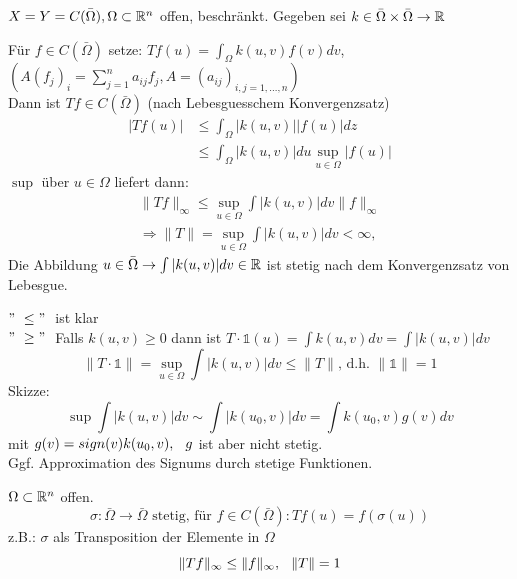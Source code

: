 \begin{beispiel}[Integraloperator]
	$X = Y = C(\bar \Omega), \Omega \subset \mathbb{R}^{n}$ offen, beschränkt.
	Gegeben sei $k \in \bar \Omega \times \bar \Omega \rightarrow \mathbb{R} $
	
	Für $f \in C(\bar \Omega)$ setze: $Tf(u) = \int_{\Omega} k(u, v) f(v) dv$, \hspace{0.25cm}
	$( A( f_{j} )_{i} = \sum_{j = 1}^{n} a_{ij}f_{j}, A = (a_{ij})_{i,j = 1, \dotsc, n} )$ \\
	
	Dann ist $Tf \in C(\bar \Omega)$ (nach Lebesguesschem Konvergenzsatz)
	\begin{align*}
		|T f(u)| & \leq \int_{\Omega} |k(u, v)| |f(u)| dz \\
				 & \leq \int_{\Omega} |k(u, v)| du \sup_{u \in \Omega} | f(u) |
	\end{align*} 				 
	$\sup$ über $u \in \Omega$ liefert dann:
	\begin{align*}
		\| Tf \|_{\infty} \leq \sup_{u \in \Omega} \int |k(u,v)| dv \| f \|_{\infty} \\
		\Rightarrow \| T \| = \sup_{u \in \Omega} \int |k(u, v)| dv < \infty,
	\end{align*} 	
	Die Abbildung $u \in \bar \Omega \rightarrow \int |k(u, v)| dv \in \mathbb{R}$ ist stetig nach dem Konvergenzsatz von Lebesgue. \\
	\begin{beweis}
		$ "\ \leq "\ $ ist klar \\
		$ "\ \geq "\ $ Falls $ k(u, v) \geq 0$ dann ist $T \cdot \mathds{1} (u) = \int k(u, v) dv = \int |k(u, v)| dv$ \\
		\[ \| T \cdot \mathds{1} \| = \sup_{u \in \Omega} \int |k(u, v)| dv \leq \| T \| \text{, d.h. } \| \mathds{1} \| = 1 \]
		Skizze:
		\[ \sup \int | k(u, v) | dv \sim \int | k(u_{0}, v) | dv = \int k(u_{0}, v) g(v) dv \]
		mit $g(v) = sign(v) k(u_{0}, v), \hspace{0.25cm} g$ ist aber nicht stetig. \\
		Ggf. Approximation des Signums durch stetige Funktionen.
	\end{beweis}
\end{beispiel}

\begin{beispiel}[Kompositionsoperator]
$\Omega \subset \mathbb{R}^{n}$ offen. 
\[ \sigma : \bar \Omega \rightarrow \bar \Omega \text{ stetig, für } f \in C(\bar \Omega): Tf(u) = f(\sigma(u)) \]
z.B.: $\sigma$ als Transposition der Elemente in $\Omega$
\[ \| Tf \|_{\infty} \leq \| f \|_{\infty}, \hspace{0.25cm} \| T \| = 1 \]
\end{beispiel}

